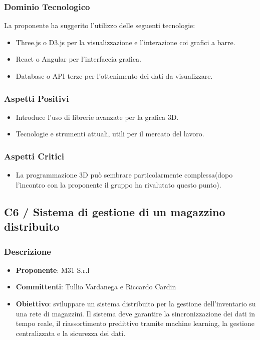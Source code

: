 \documentclass[a4paper, 12pt]{article}
\begin{document}
\subsubsection{Dominio Tecnologico}
La proponente ha suggerito l’utilizzo delle seguenti tecnologie:
\begin{itemize}
    \item Three.js o  D3.js  per la visualizzazione e l'interazione coi grafici a barre.
    \item React o Angular per l’interfaccia grafica.
    \item Database o API terze per l’ottenimento dei dati da visualizzare.
\end{itemize}

\subsubsection{Aspetti Positivi}
\begin{itemize}
    \item Introduce l'uso di librerie avanzate per la grafica 3D.
    \item Tecnologie e strumenti attuali, utili per il mercato del lavoro.
\end{itemize}

\subsubsection{Aspetti Critici}
\begin{itemize}
    \item La programmazione 3D può sembrare particolarmente complessa(dopo l'incontro con la proponente il gruppo ha rivalutato questo punto).
\end{itemize}

\subsection{C6 / Sistema di gestione di un magazzino distribuito}
\subsubsection{Descrizione}
\begin{itemize}
    \item \textbf{Proponente}: M31 S.r.l
    \item \textbf{Committenti}: Tullio Vardanega e Riccardo Cardin
    \item \textbf{Obiettivo}: sviluppare un sistema distribuito per la gestione dell'inventario su una rete di magazzini. Il sistema deve garantire la sincronizzazione dei dati in tempo reale, il riassortimento predittivo tramite machine learning, la gestione centralizzata e la sicurezza dei dati.
\end{itemize}
\end{document}
